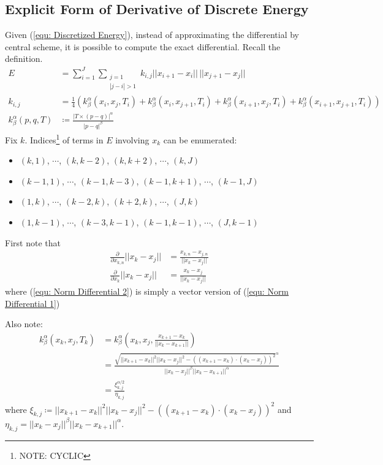 \documentclass[a4paper, 11pt]{article}
\newcommand{\norm}[1]{||#1||}
\theoremstyle{definition}
\theoremstyle{remark}
\begin{document}
\subsection{Explicit Form of Derivative of Discrete Energy}
Given (\ref{equ: Discretized Energy}), instead of approximating the differential by central scheme,
it is possible to compute the exact differential.
Recall the definition.
\begin{align}
    E &= \sum_{i = 1}^{J} \sum_{\substack{j = 1 \\ |j-i| > 1}} k_{i,j} \norm{x_{i+1} - x_i} \, \norm{x_{j+1} - x_j} 
    \\
    k_{i,j} &= \frac{1}{4} \left( 
        k_{\beta}^{\alpha} \left( x_i, x_j, T_i \right)
        + k_{\beta}^{\alpha} \left( x_i, x_{j+1}, T_i \right)
        + k_{\beta}^{\alpha} \left( x_{i+1}, x_j, T_i \right)
        + k_{\beta}^{\alpha} \left( x_{i+1}, x_{j+1}, T_i \right)
    \right)
    \\
    k_{\beta}^{\alpha} \left( p, q, T \right) &\coloneqq \frac{|T \times \left( p-q \right)|^\alpha}{|p-q|^{\beta}}
\end{align}
Fix $k$. Indices\footnote{NOTE: CYCLIC} of terms in $E$ involving $x_k$ can be enumerated:
\begin{itemize}
    \item $(k,1)$, $\cdots$, $(k, k-2)$, $(k, k+2)$, $\cdots$, $(k,J)$
    \item $(k-1,1)$, $\cdots$, $(k-1, k-3)$, $(k-1, k+1)$, $\cdots$, $(k-1,J)$
    \item $(1,k)$, $\cdots$, $(k-2, k)$, $(k+2, k)$, $\cdots$, $(J,k)$
    \item $(1,k-1)$, $\cdots$, $(k-3, k-1)$, $(k-1, k-1)$, $\cdots$, $(J,k-1)$
\end{itemize}

First note that 
\begin{align}
    \frac{\partial}{\partial x_{k,n}} \norm{x_k - x_{j}} &= \frac{x_{k,n} - x_{j,n}}{\norm{x_k - x_{j}}}
    \label{equ: Norm Differential 1} \\
    \frac{\partial}{\partial x_k} \norm{x_k - x_{j}} &= \frac{x_k - x_{j}}{\norm{x_k - x_{j}}}
    \label{equ: Norm Differential 2}
\end{align}
where (\ref{equ: Norm Differential 2}) is simply a vector version of (\ref{equ: Norm Differential 1})

Also note:
\begin{align}
    k_{\beta}^{\alpha} \left( x_k, x_j, T_k \right) &= k_{\beta}^{\alpha} \left( x_k, x_j, \frac{x_{k+1} - x_{k}}{\norm{x_{k} - x_{k+1}}} \right)
    \\
    &= \frac{\sqrt{\norm{x_{k+1} - x_k}^2 \norm{x_k - x_j}^2- \left( \left( x_{k+1} - x_{k} \right) \cdot \left( x_{k} - x_{j} \right) \right)^2}^{\alpha} }{\norm{x_k - x_j}^{\beta} \norm{x_k - x_{k+1}}^{\alpha}} \\
    &= \frac{\xi_{k,j}^{\alpha/2}}{\eta_{k,j}}
\end{align}
where $\xi_{k,j} \coloneqq \norm{x_{k+1} - x_k}^2 \norm{x_k - x_j}^2- \left( \left( x_{k+1} - x_{k} \right) \cdot \left( x_{k} - x_{j} \right) \right)^2$ and $\eta_{k,j} = \norm{x_k -x_j}^{\beta} \norm{x_k - x_{k+1}}^{\alpha}$.
\end{document}

